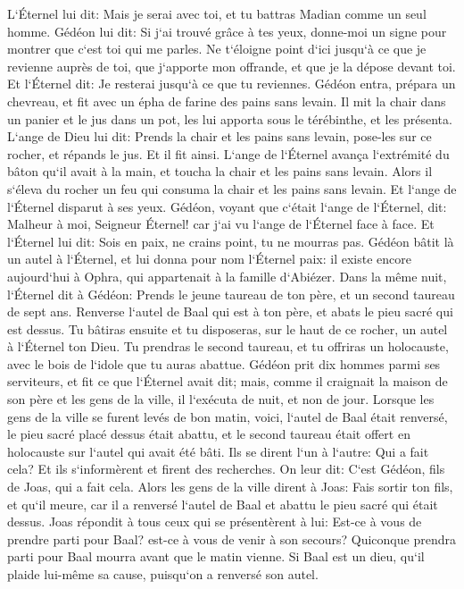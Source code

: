 \verse L`Éternel lui dit: Mais je serai avec toi, et tu battras Madian comme un seul homme. 
\verse Gédéon lui dit: Si j`ai trouvé grâce à tes yeux, donne-moi un signe pour montrer que c`est toi qui me parles. 
\verse Ne t`éloigne point d`ici jusqu`à ce que je revienne auprès de toi, que j`apporte mon offrande, et que je la dépose devant toi. Et l`Éternel dit: Je resterai jusqu`à ce que tu reviennes. 
\verse Gédéon entra, prépara un chevreau, et fit avec un épha de farine des pains sans levain. Il mit la chair dans un panier et le jus dans un pot, les lui apporta sous le térébinthe, et les présenta. 
\verse L`ange de Dieu lui dit: Prends la chair et les pains sans levain, pose-les sur ce rocher, et répands le jus. Et il fit ainsi. 
\verse L`ange de l`Éternel avança l`extrémité du bâton qu`il avait à la main, et toucha la chair et les pains sans levain. Alors il s`éleva du rocher un feu qui consuma la chair et les pains sans levain. Et l`ange de l`Éternel disparut à ses yeux. 
\verse Gédéon, voyant que c`était l`ange de l`Éternel, dit: Malheur à moi, Seigneur Éternel! car j`ai vu l`ange de l`Éternel face à face. 
\verse Et l`Éternel lui dit: Sois en paix, ne crains point, tu ne mourras pas. 
\verse Gédéon bâtit là un autel à l`Éternel, et lui donna pour nom l`Éternel paix: il existe encore aujourd`hui à Ophra, qui appartenait à la famille d`Abiézer. 
\verse Dans la même nuit, l`Éternel dit à Gédéon: Prends le jeune taureau de ton père, et un second taureau de sept ans. Renverse l`autel de Baal qui est à ton père, et abats le pieu sacré qui est dessus. 
\verse Tu bâtiras ensuite et tu disposeras, sur le haut de ce rocher, un autel à l`Éternel ton Dieu. Tu prendras le second taureau, et tu offriras un holocauste, avec le bois de l`idole que tu auras abattue. 
\verse Gédéon prit dix hommes parmi ses serviteurs, et fit ce que l`Éternel avait dit; mais, comme il craignait la maison de son père et les gens de la ville, il l`exécuta de nuit, et non de jour. 
\verse Lorsque les gens de la ville se furent levés de bon matin, voici, l`autel de Baal était renversé, le pieu sacré placé dessus était abattu, et le second taureau était offert en holocauste sur l`autel qui avait été bâti. 
\verse Ils se dirent l`un à l`autre: Qui a fait cela? Et ils s`informèrent et firent des recherches. On leur dit: C`est Gédéon, fils de Joas, qui a fait cela. 
\verse Alors les gens de la ville dirent à Joas: Fais sortir ton fils, et qu`il meure, car il a renversé l`autel de Baal et abattu le pieu sacré qui était dessus. 
\verse Joas répondit à tous ceux qui se présentèrent à lui: Est-ce à vous de prendre parti pour Baal? est-ce à vous de venir à son secours? Quiconque prendra parti pour Baal mourra avant que le matin vienne. Si Baal est un dieu, qu`il plaide lui-même sa cause, puisqu`on a renversé son autel. 
